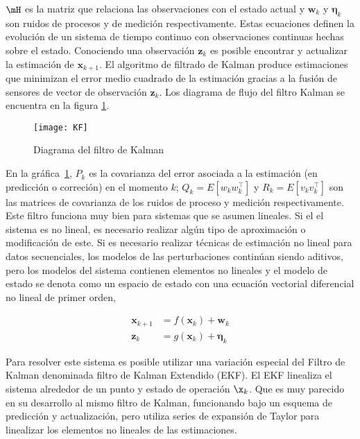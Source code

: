 $\mH$ es la matriz que relaciona las observaciones con el estado actual
y $\mathbf{w}_k$ y $\mathbf{\eta}_k$ son ruidos de procesos y de medición respectivamente.
Estas ecuaciones definen la evolución de un sistema de tiempo continuo con observaciones continuas hechas sobre el estado.
Conociendo una observación $\mathbf{z}_{k}$ es posible encontrar y actualizar la estimación de $\mathbf{x}_{k+1}$.
El algoritmo de filtrado de Kalman produce estimaciones que minimizan el error medio cuadrado de la estimación gracias a la fusión de sensores de vector de observación $\mathbf{z}_{k}$.
Los diagrama de flujo del filtro Kalman se encuentra en la figura \ref{KF}.\par
\begin{figure}[h!]
	\centering
	\texttt{[image: KF]}
	\caption{Diagrama del filtro de Kalman}
	\label{KF}
\end{figure}

En la gráfica~\ref{KF}, $P_{k}$ es la covarianza del error asociada a la estimación (en predicción o correción) en el momento $k$;
$Q_k=E[w_k w_k^\intercal]$ y $R_k=E[v_k v_k^\intercal]$ son las matrices de covarianza de los ruidos de proceso y medición respectivamente.
Este filtro funciona muy bien para sistemas que se asumen lineales.
Si el el sistema es no lineal, es necesario realizar algún tipo de aproximación o modificación de este.
Si es necesario realizar técnicas de estimación no lineal para datos secuenciales,
los modelos de las perturbaciones continúan siendo aditivos, pero los modelos del sistema contienen elementos no lineales y el modelo de estado se denota como un espacio de estado con una ecuación vectorial diferencial no lineal de primer orden,

\begin{align}
	\mathbf{x}_{k+1}&=f(\mathbf{x}_k) + \mathbf{w}_k\\
	\mathbf{z}_{k}&=g(\mathbf{x}_k) + \mathbf{\eta}_k
\end{align}

Para resolver este sistema es posible utilizar una variación especial del Filtro de Kalman denominada filtro de Kalman Extendido (EKF).
El EKF linealiza el sistema alrededor de un punto y estado de operación $\x_k$.
Que es muy parecido en su desarrollo al mismo filtro de Kalman, 
funcionando bajo un esquema de predicción y actualización, pero utiliza series de expansión de Taylor para linealizar los elementos no lineales de las estimaciones.

